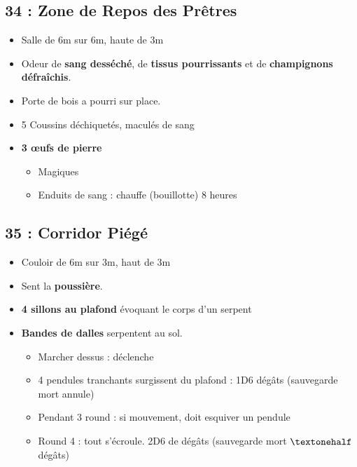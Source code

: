 \subsection{34 : Zone de Repos des Prêtres}\label{n3:s34}
\begin{itemize}
  \item Salle de 6m sur 6m, haute de 3m
  \item Odeur de \textbf{sang desséché}, de \textbf{tissus pourrissants} et de \textbf{champignons défraîchis}.
  \item Porte de bois a pourri sur place.
  \item 5 Coussins déchiquetés, maculés de sang
  \item \textbf{3 \oe ufs de pierre }
  \begin{itemize}
    \item Magiques
    \item Enduits de sang : chauffe (bouillotte) 8 heures
  \end{itemize}
\end{itemize}

\subsection{35 : Corridor Piégé}\label{n3:s35}
\begin{itemize}
  \item Couloir de 6m sur 3m, haut de 3m
  \item Sent la \textbf{poussière}.
  \item \textbf{4 sillons au plafond} évoquant le corps d'un serpent
  \item \textbf{Bandes de dalles} serpentent au sol.
  \begin{itemize}
    \item Marcher dessus : déclenche
    \item 4 pendules tranchants surgissent du plafond : 1D6 dégâts (sauvegarde mort annule)
    \item Pendant 3 round : si mouvement, doit esquiver un pendule
    \item Round 4 : tout s'écroule. 2D6 de dégâts (sauvegarde mort $\textonehalf$ dégâts)
  \end{itemize}
\end{itemize}

\vfill

